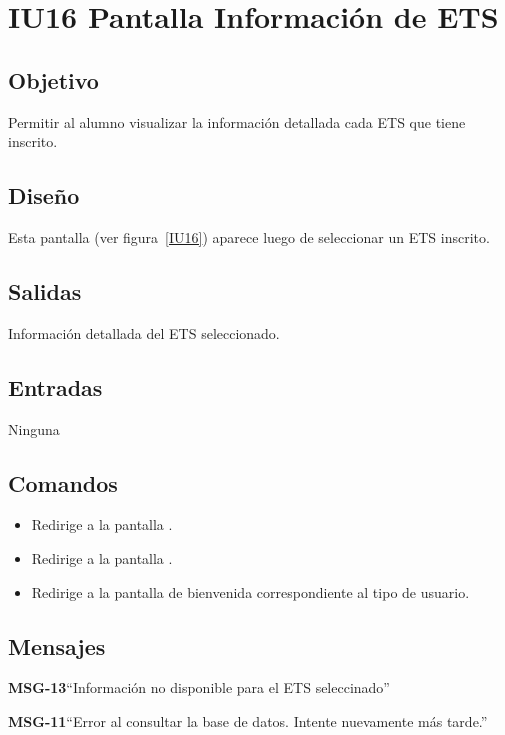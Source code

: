 \section{IU16 Pantalla Información de ETS}

\subsection{Objetivo}
Permitir al alumno visualizar la información detallada cada ETS que tiene inscrito.

\subsection{Diseño}
Esta pantalla  (ver figura~\ref{IU16}) aparece luego de seleccionar un ETS inscrito. 


\subsection{Salidas}

Información detallada del ETS seleccionado. 

\subsection{Entradas}
Ninguna


\subsection{Comandos}
\begin{itemize}
	\item {} Redirige a la pantalla .
    \item {} Redirige a la pantalla .
    \item {} Redirige a la pantalla de bienvenida correspondiente al tipo de usuario.
\end{itemize}

\subsection{Mensajes}

\begin{Citemize}
	\item {\bf MSG-13}{``Información no disponible para el ETS seleccinado''}
	\item {\bf MSG-11}{``Error al consultar la base de datos. Intente nuevamente más tarde.''}
\end{Citemize}


